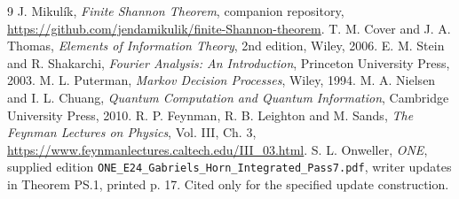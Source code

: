 \documentclass[11pt]{article}
\theoremstyle{remark}\newtheorem{remark}[theorem]{Remark}
\begin{document}
\begin{thebibliography}{9}
 J. Mikul\'ik, \emph{Finite Shannon Theorem}, companion repository,
\url{https://github.com/jendamikulik/finite-Shannon-theorem}.
 T. M. Cover and J. A. Thomas, \emph{Elements of Information Theory},
2nd edition, Wiley, 2006.
 E. M. Stein and R. Shakarchi, \emph{Fourier Analysis:
An Introduction}, Princeton University Press, 2003.
 M. L. Puterman, \emph{Markov Decision Processes}, Wiley, 1994.
 M. A. Nielsen and I. L. Chuang, \emph{Quantum Computation and
Quantum Information}, Cambridge University Press, 2010.
 R. P. Feynman, R. B. Leighton and M. Sands,
\emph{The Feynman Lectures on Physics}, Vol. III, Ch. 3,
\url{https://www.feynmanlectures.caltech.edu/III_03.html}.
 S. L. Onweller, \emph{ONE}, supplied edition
\texttt{ONE\_E24\_Gabriels\_Horn\_Integrated\_Pass7.pdf}, writer updates in
Theorem PS.1, printed p. 17. Cited only for the specified update construction.
\end{thebibliography}
\end{document}

